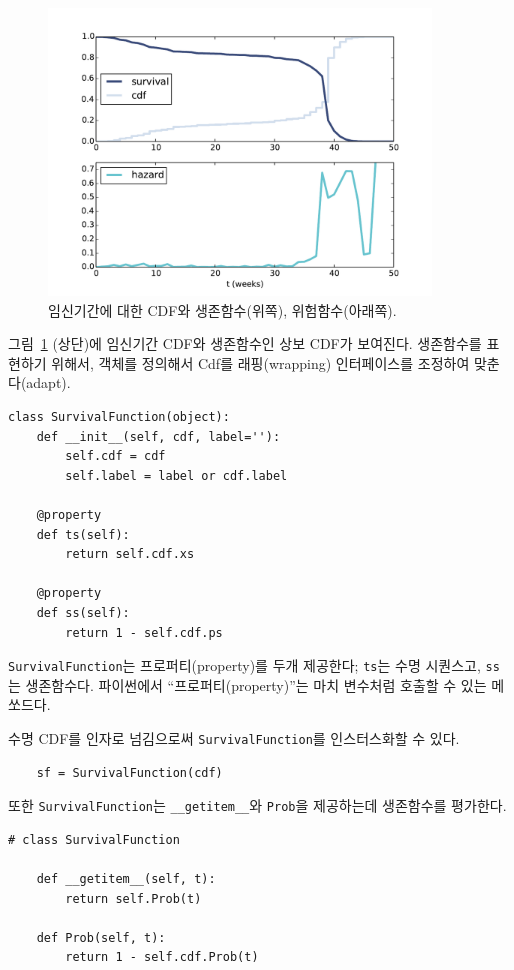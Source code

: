 \begin{figure}
\centerline{\includegraphics[height=3.0in]{figs/survival1.pdf}}
\caption{임신기간에 대한 CDF와 생존함수(위쪽), 위험함수(아래쪽).}
\label{survival1}
\end{figure}

그림~\ref{survival1} (상단)에 임신기간 CDF와 생존함수인 상보 CDF가 보여진다. 생존함수를 표현하기 위해서, 객체를 정의해서 Cdf를 래핑(wrapping) 인터페이스를 조정하여 맞춘다(adapt).

\begin{verbatim}
class SurvivalFunction(object):
    def __init__(self, cdf, label=''):
        self.cdf = cdf
        self.label = label or cdf.label

    @property
    def ts(self):
        return self.cdf.xs

    @property
    def ss(self):
        return 1 - self.cdf.ps
\end{verbatim}

{\tt SurvivalFunction}는 프로퍼티(property)를 두개 제공한다; {\tt ts}는 수명 시퀀스고, {\tt ss}는 생존함수다.
파이썬에서 ``프로퍼티(property)''는 마치 변수처럼 호출할 수 있는 메쏘드다.

수명 CDF를 인자로 넘김으로써 {\tt SurvivalFunction}를 인스터스화할 수 있다.

\begin{verbatim}
    sf = SurvivalFunction(cdf)
\end{verbatim}

또한 {\tt SurvivalFunction}는 \verb"__getitem__"와 {\tt Prob}을 제공하는데 생존함수를 평가한다.

\begin{verbatim}
# class SurvivalFunction

    def __getitem__(self, t):
        return self.Prob(t)

    def Prob(self, t):
        return 1 - self.cdf.Prob(t)
\end{verbatim}

